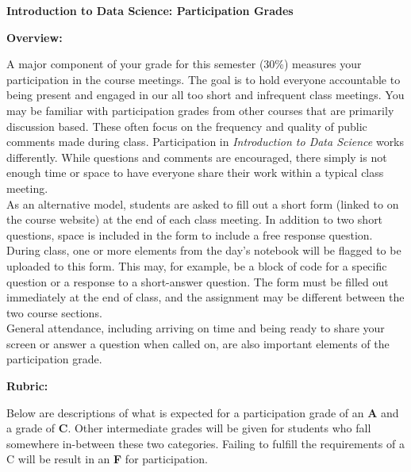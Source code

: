 \documentclass[12pt, a4paper]{article}
\makeatletter
\newcommand{\magenta}[1]{\textcolor{solarized@magenta}{#1}}
\makeatother
\begin{document}
\begin{center}
\textbf{Introduction to Data Science: Participation Grades}
\end{center}

\vspace{0.5cm}

\textbf{Overview:} \vspace{6pt}

A major component of your grade for this semester (30\%) measures your
participation in the course meetings. The goal is to hold everyone
accountable to being present and engaged in our all too short and infrequent
class meetings. You may be familiar with participation grades from other
courses that are primarily discussion based. These often focus on the
frequency and quality of public comments made during class. Participation in
\textit{Introduction to Data Science} works differently. While questions and
comments are encouraged, there simply is not enough time or space to have
everyone share their work within a typical class meeting. \\

As an alternative model, students are asked to fill out a short form (linked
to on the course website) at the end of each class meeting. In addition to
two short questions, space is included in the form to include a free
response question. During class, one or more elements from
the day's notebook will be flagged to be uploaded to this form. This may,
for example, be a block of code for a specific question or a response to a
short-answer question. The form must be filled out immediately at the end of
class, and the assignment may be different between the two course sections. \\

General attendance, including arriving on time and being ready to share your
screen or answer a question when called on, are also important elements of
the participation grade.

\bigskip

\textbf{Rubric:} \vspace{6pt}

Below are descriptions of what is expected for a participation grade of an
\textbf{\magenta{A}} and a grade of \textbf{\magenta{C}}. Other intermediate
grades will be given for students who fall somewhere in-between these two
categories. Failing to fulfill the requirements of a C will be result in an
\textbf{\magenta{F}} for participation. \\
\end{document}
